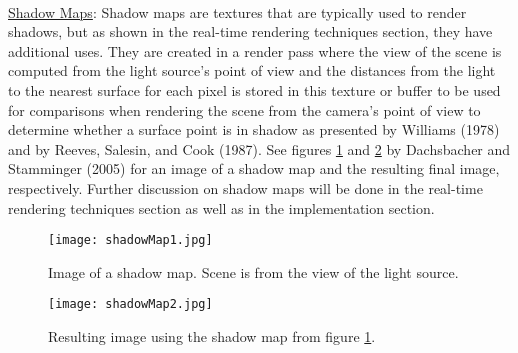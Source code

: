 \paragraph{}
\underline{Shadow Maps}: Shadow maps are textures that are typically used to render shadows, but as shown in the real-time rendering techniques section, they have additional uses.  They are created in a render pass where the view of the scene is computed from the light source's point of view and the distances from the light to the nearest surface for each pixel is stored in this texture or buffer to be used for comparisons when rendering the scene from the camera's point of view to determine whether a surface point is in shadow as presented by Williams (1978) and by Reeves, Salesin, and Cook (1987).  See figures \ref{fig:shadowMap1} and \ref{fig:shadowMap2} by Dachsbacher and Stamminger (2005) for an image of a shadow map and the resulting final image, respectively.  Further discussion on shadow maps will be done in the real-time rendering techniques section as well as in the implementation section.
\begin{figure}[h!]
  \centering
    \texttt{[image: shadowMap1.jpg]}
  \caption{Image of a shadow map. Scene is from the view of the light source.}
	\label{fig:shadowMap1}
\end{figure}
\begin{figure}[h!]
  \centering
    \texttt{[image: shadowMap2.jpg]}
  \caption{Resulting image using the shadow map from figure \ref{fig:shadowMap1}.}
	\label{fig:shadowMap2}
\end{figure}

